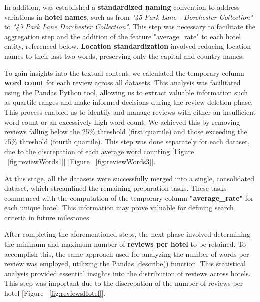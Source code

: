 \documentclass[sigconf]{acmart}
\begin{document}
In addition, was established a \textbf{standardized naming} convention to address variations in \textbf{hotel names}, such as from \textit{"45 Park Lane - Dorchester Collection"} to \textit{"45 Park Lane Dorchester Collection"}. This step was necessary to facilitate the aggregation step and the addition of the feature "average\_rate" to each hotel entity, referenced below. \textbf{Location standardization} involved reducing location names to their last two words, preserving only the capital and country names.

To gain insights into the textual content, we calculated the temporary column \textbf{word count} for each review across all datasets. This analysis was facilitated using the Pandas \cite{Pandas} Python tool, allowing us to extract valuable information such as quartile ranges and make informed decisions during the review deletion phase. This process enabled us to identify and manage reviews with either an insufficient word count or an excessively high word count. We achieved this by removing reviews falling below the 25\% threshold (first quartile) and those exceeding the 75\% threshold (fourth quartile). This step was done separately for each dataset, due to the discrepation of each average word counting [Figure ~\ref{fig:reviewWords1}] [Figure ~\ref{fig:reviewWords3}].

At this stage, all the datasets were successfully merged into a single, consolidated dataset, which streamlined the remaining preparation tasks. These tasks commenced with the computation of the temporary column \textbf{"average\_rate"} for each unique hotel. This information may prove valuable for defining search criteria in future milestones.

After completing the aforementioned steps, the next phase involved determining the minimum and maximum number of \textbf{reviews per hotel} to be retained. To accomplish this, the same approach used for analyzing the number of words per review was employed, utilizing the Pandas \cite{Pandas} .describe() function. This statistical analysis provided essential insights into the distribution of reviews across hotels. This step was important due to the discrepation of the number of reviews per hotel [Figure ~\ref{fig:reviewsHotel}].
\end{document}

